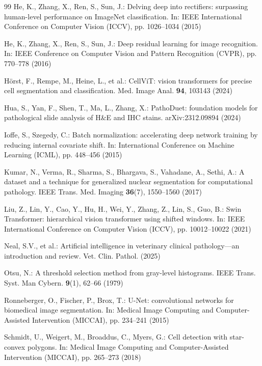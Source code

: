 \documentclass[runningheads]{llncs}
\begin{document}
\begin{thebibliography}{99}
He, K., Zhang, X., Ren, S., Sun, J.: Delving deep into rectifiers: surpassing human-level performance on ImageNet classification. In: IEEE International Conference on Computer Vision (ICCV), pp. 1026--1034 (2015)

He, K., Zhang, X., Ren, S., Sun, J.: Deep residual learning for image recognition. In: IEEE Conference on Computer Vision and Pattern Recognition (CVPR), pp. 770--778 (2016)

H\"orst, F., Rempe, M., Heine, L., et al.: CellViT: vision transformers for precise cell segmentation and classification. Med. Image Anal. \textbf{94}, 103143 (2024)

Hua, S., Yan, F., Shen, T., Ma, L., Zhang, X.: PathoDuet: foundation models for pathological slide analysis of H\&E and IHC stains. arXiv:2312.09894 (2024)

Ioffe, S., Szegedy, C.: Batch normalization: accelerating deep network training by reducing internal covariate shift. In: International Conference on Machine Learning (ICML), pp. 448--456 (2015)

Kumar, N., Verma, R., Sharma, S., Bhargava, S., Vahadane, A., Sethi, A.: A dataset and a technique for generalized nuclear segmentation for computational pathology. IEEE Trans. Med. Imaging \textbf{36}(7), 1550--1560 (2017)

Liu, Z., Lin, Y., Cao, Y., Hu, H., Wei, Y., Zhang, Z., Lin, S., Guo, B.: Swin Transformer: hierarchical vision transformer using shifted windows. In: IEEE International Conference on Computer Vision (ICCV), pp. 10012--10022 (2021)

Neal, S.V., et al.: Artificial intelligence in veterinary clinical pathology---an introduction and review. Vet. Clin. Pathol. (2025)

Otsu, N.: A threshold selection method from gray-level histograms. IEEE Trans. Syst. Man Cybern. \textbf{9}(1), 62--66 (1979)

Ronneberger, O., Fischer, P., Brox, T.: U-Net: convolutional networks for biomedical image segmentation. In: Medical Image Computing and Computer-Assisted Intervention (MICCAI), pp. 234--241 (2015)

Schmidt, U., Weigert, M., Broaddus, C., Myers, G.: Cell detection with star-convex polygons. In: Medical Image Computing and Computer-Assisted Intervention (MICCAI), pp. 265--273 (2018)


\end{thebibliography}
\end{document}

